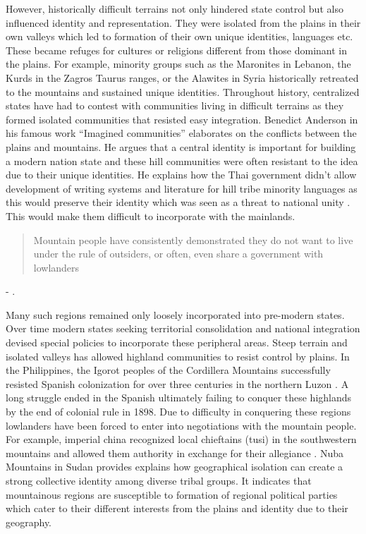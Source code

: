 \begin{sloppypar}
\vspace{0.3cm}

However, historically difficult terrains not only hindered state control but also influenced identity and representation. They were isolated from the plains in their own valleys which led to formation of their own unique identities, languages etc. These became refuges for cultures or religions different from those dominant in the plains. For example, minority groups such as the Maronites in Lebanon, the Kurds in the Zagros Taurus ranges, or the Alawites in Syria historically retreated to the mountains and sustained unique identities.
 Throughout history, centralized states have had to contest with communities living in difficult terrains as they formed isolated communities that resisted easy integration. Benedict Anderson in his famous work ``Imagined communities'' elaborates on the conflicts between the plains and mountains. He argues that a central identity is important for building a modern nation state and these hill communities were often resistant to the idea due to their unique identities. He explains how the Thai government didn't allow development of writing systems and literature for hill tribe minority languages as this would preserve their identity which was seen as a threat to national unity \citep{anderson1991imagined}. This would make them difficult to incorporate with the mainlands.  \begin{quote} Mountain people have consistently demonstrated they do not want to live under the rule of outsiders, or often, even share a government with lowlanders\end{quote} 

\hspace*{\fill} - \cite{Hammes2017}. 



Many such regions remained only loosely incorporated into pre-modern states. Over time modern states seeking territorial consolidation and national integration devised special policies to incorporate these peripheral areas. Steep terrain and isolated valleys has allowed highland communities to  resist control by plains. In the Philippines, the Igorot peoples of the Cordillera Mountains successfully resisted Spanish colonization for over three centuries in the northern Luzon \citep{scott1970igorot}. A long struggle ended in the Spanish ultimately failing to conquer these highlands by the end of colonial rule in 1898. Due to difficulty in conquering these regions lowlanders have been forced to enter into negotiations with the mountain people. For example, imperial china  recognized local chieftains (tusi) in the southwestern mountains and allowed them authority in exchange for their allegiance \citep{took2005native}. Nuba Mountains in Sudan provides explains how geographical isolation can create a strong collective identity among diverse tribal groups. It indicates that mountainous regions are susceptible to formation of regional political parties which cater to their different interests from the plains and identity due to their geography.


\end{sloppypar}
